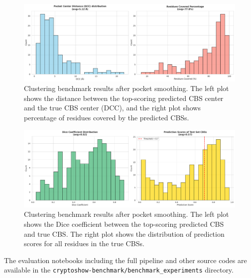 \begin{figure}[htbp]
    \centering
    \includegraphics[width=\textwidth]{img/smoothened-1.pdf}
    \caption{Clustering benchmark results after pocket smoothing. The left plot shows the distance between the top-scoring predicted CBS center and the true CBS center (DCC), and the right plot shows percentage of residues covered by the predicted CBSs.}
    \label{fig:clustering-benchmark-smoothened}
\end{figure}

\begin{figure}[htbp]
    \centering
    \includegraphics[width=\textwidth]{img/smoothened-2.pdf}
    \caption{Clustering benchmark results after pocket smoothing. The left plot shows the Dice coefficient between the top-scoring predicted CBS and true CBS. The right plot shows the distribution of prediction scores for all residues in the true CBSs.}
    \label{fig:clustering-benchmark-smoothened-dice}
\end{figure}

The evaluation notebooks including the full pipeline and other source codes are available in the \lstinline!cryptoshow-benchmark/benchmark_experiments! directory.
